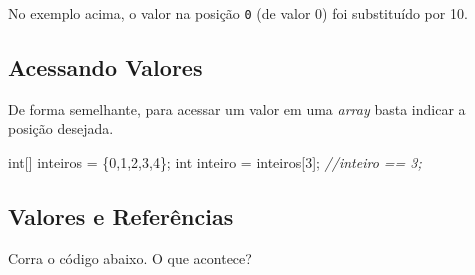 \documentclass[
]{book}
\newenvironment{Shaded}{\begin{snugshade}}{\end{snugshade}}
\newcommand{\CommentTok}[1]{\textcolor[rgb]{0.56,0.35,0.01}{\textit{#1}}}
\newcommand{\DataTypeTok}[1]{\textcolor[rgb]{0.13,0.29,0.53}{#1}}
\newcommand{\DecValTok}[1]{\textcolor[rgb]{0.00,0.00,0.81}{#1}}
\newcommand{\NormalTok}[1]{#1}
\begin{document}
No exemplo acima, o valor na posição \texttt{0} (de valor 0) foi substituído por 10.

\hypertarget{acessando-valores}{%
\subsection{Acessando Valores}\label{acessando-valores}}

De forma semelhante, para acessar um valor em uma \emph{array} basta indicar a posição desejada.

\begin{Shaded}
\begin{Highlighting}[]
\DataTypeTok{int}\NormalTok{[] inteiros = \{}\DecValTok{0}\NormalTok{,}\DecValTok{1}\NormalTok{,}\DecValTok{2}\NormalTok{,}\DecValTok{3}\NormalTok{,}\DecValTok{4}\NormalTok{\};}
\DataTypeTok{int}\NormalTok{ inteiro = inteiros[}\DecValTok{3}\NormalTok{];}
\CommentTok{//inteiro == 3;}
\end{Highlighting}
\end{Shaded}

\hypertarget{valores-e-referuxeancias}{%
\subsection{Valores e Referências}\label{valores-e-referuxeancias}}

Corra o código abaixo. O que acontece?
\end{document}
